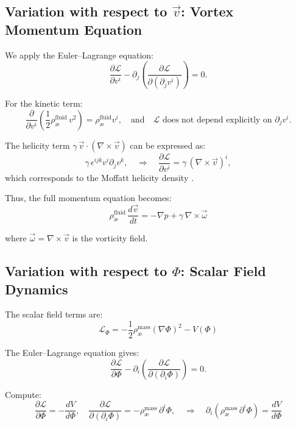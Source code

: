 \documentclass[12pt]{article}
\begin{document}
\subsection*{Variation with respect to $\vec{v}$: Vortex Momentum Equation}

We apply the Euler--Lagrange equation:
\[
    \frac{\partial \mathcal{L}}{\partial v^i} - \partial_j \left( \frac{\partial \mathcal{L}}{\partial (\partial_j v^i)} \right) = 0.
\]

For the kinetic term:
\[
  \frac{\partial}{\partial v^i} \left( \frac{1}{2} \rho_\text{\ae}^{\text{fluid}}\, v^2 \right) = \rho_\text{\ae}^{\text{fluid}} v^i,
    \quad \text{and} \quad
    \mathcal{L} \text{ does not depend explicitly on } \partial_j v^i.
\]

The helicity term \( \gamma\, \vec{v} \cdot (\nabla \times \vec{v}) \) can be expressed as:
\[
    \gamma\, \epsilon^{ijk} v^i \partial_j v^k,
    \quad \Rightarrow \quad \frac{\partial \mathcal{L}}{\partial v^i} = \gamma\, (\nabla \times \vec{v})^i,
\]
which corresponds to the Moffatt helicity density \cite{moffatt1969}.

Thus, the full momentum equation becomes:
\begin{equation}
    \boxed{
        \rho_\text{\ae}^{\text{fluid}}\, \frac{d \vec{v}}{dt} = - \nabla p + \gamma\, \nabla \times \vec{\omega}
    }
\end{equation}

where \( \vec{\omega} = \nabla \times \vec{v} \) is the vorticity field.


\subsection*{Variation with respect to $\Phi$: Scalar Field Dynamics}

The scalar field terms are:
\[
    \mathcal{L}_\Phi = - \frac{1}{2} \rho_\text{\ae}^{\text{mass}} (\nabla \Phi)^2 - V(\Phi)
\]

The Euler--Lagrange equation gives:
\[
    \frac{\partial \mathcal{L}}{\partial \Phi} - \partial_i \left( \frac{\partial \mathcal{L}}{\partial (\partial_i \Phi)} \right) = 0.
\]

Compute:
\[
    \frac{\partial \mathcal{L}}{\partial \Phi} = -\frac{dV}{d\Phi}, \quad
   \frac{\partial \mathcal{L}}{\partial (\partial_i \Phi)} = - \rho_\text{\ae}^{\text{mass}}\, \partial^i \Phi,
    \quad \Rightarrow \quad
    \partial_i ( \rho_\text{\ae}^{\text{mass}}\, \partial^i \Phi ) = \frac{dV}{d\Phi}
\]
\end{document}
